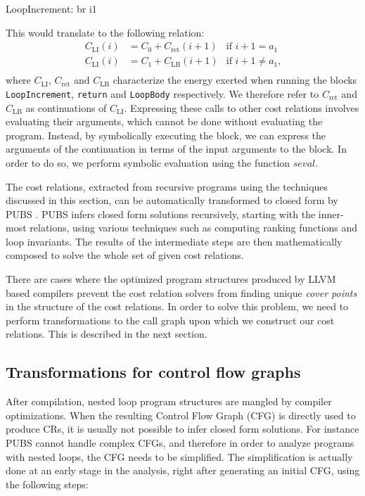 \documentclass[9pt,preprint]{sigplanconf}
\newcommand{\mathspace}[1]{\ensuremath{#1}\xspace}
\newcommand{\CR}[1]{\mathspace{C_{\operatorname{#1}}}}
\newcommand{\seval}{\mathspace{\mathit{seval}}}
\newcommand{\seclabel}[1]{\label{sec:#1}}
\begin{document}
\begin{llvmcode}
  LoopIncrement:
br i1 \end{llvmcode}

\noindent This would translate to the following relation:
\begin{align*}
\CR{LI}(i) &=  C_0 + \CR{ret}(i+1)         &\text{if }i+1 = a_1~ \\
\CR{LI}(i) &=  C_1 + \CR{LB}(i+1)         &\text{if }i+1 \neq a_1 \text{,}\\
\end{align*}
where \CR{LI}, \CR{ret} and \CR{LB} characterize the energy exerted when running the blocks
\texttt{LoopIncrement}, \texttt{return} and \texttt{LoopBody}
respectively. We therefore refer to \CR{ret} and \CR{LB} as continuations of
\CR{LI}. Expressing these calls to other cost relations involves evaluating
their arguments, which cannot be done without evaluating the
program. Instead, by symbolically executing the block, we can express the
arguments of the continuation in terms of the input arguments to the block. In
order to do so, we perform symbolic evaluation using the function \seval.

The cost relations, extracted from recursive programs using the techniques
discussed in this section, can be automatically transformed to closed form by PUBS
\cite{AlbertAGP11a}.
PUBS infers closed form solutions recursively, starting with the inner-most
relations, using various techniques such as computing ranking functions and loop
invariants. The results of the intermediate steps are then mathematically composed to
solve the whole set of given cost relations.


There are cases where the optimized program structures produced by LLVM based
compilers prevent the cost relation solvers from finding unique \emph{cover
points} in the structure of the cost relations. In order to solve this problem,
we need to perform transformations to the call graph upon which we construct our
cost relations. This is described in the next section.

\subsection{Transformations for control flow graphs}\seclabel{transformations}
After compilation, nested loop program structures are mangled
by compiler optimizations. When the resulting Control Flow Graph (CFG) is directly
used to produce CRs, it is usually not possible to infer closed form
solutions. For instance PUBS \cite{AlbertAGP11a} cannot handle complex CFGs, and
therefore in order to analyze programs with nested loops, the
CFG needs to be simplified. The simplification is actually done at an early
stage in the analysis, right after generating an initial CFG,
using the following steps:
\end{document}
